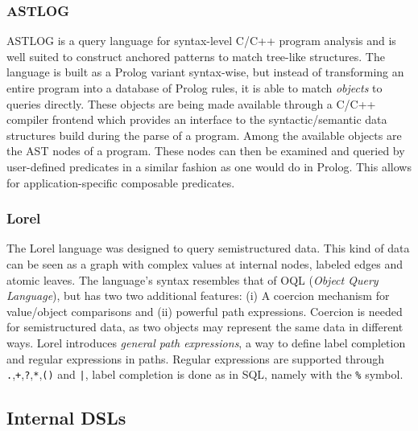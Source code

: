 \subsubsection*{ASTLOG}
ASTLOG\cite{Crew:1997} is a query language for syntax-level C/C++ program analysis and is well suited to construct anchored patterns to match tree-like structures. The language is built as a Prolog variant syntax-wise, but instead of transforming an entire program into a database of Prolog rules, it is able to match \textit{objects} to queries directly. These objects are being made available through a C/C++ compiler frontend which provides an interface to the syntactic/semantic data structures build during the parse of a program. Among the available objects are the AST nodes of a program. These nodes can then be examined and queried by user-defined predicates in a similar fashion as one would do in Prolog. This allows for application-specific composable predicates. 

\subsubsection*{Lorel}
The Lorel language\cite{abiteboul1997lorel} was designed to query semistructured data. This kind of data can be seen as a graph with complex values at internal nodes, labeled edges and atomic leaves. The language's syntax resembles that of OQL (\textit{Object Query Language}), but has two two additional features: (i) A coercion mechanism for value/object comparisons and (ii) powerful path expressions. Coercion is needed for semistructured data, as two objects may represent the same data in different ways. Lorel introduces \textit{general path expressions}, a way to define label completion and regular expressions in paths. Regular expressions are supported through \texttt{.},\texttt{+},\texttt{?},\texttt{*},\texttt{()} and \texttt{|}, label completion is done as in SQL, namely with the \texttt{\%} symbol.



\subsection{Internal DSLs}

